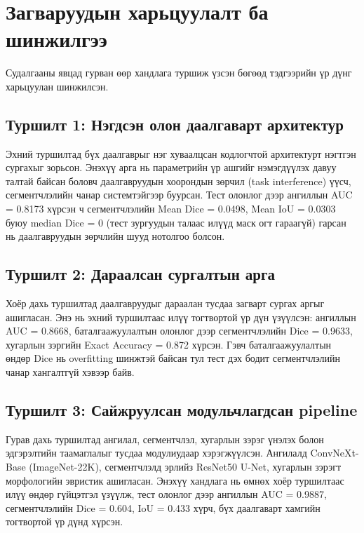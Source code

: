 \section{Загваруудын харьцуулалт ба шинжилгээ}

Судалгааны явцад гурван өөр хандлага туршиж үзсэн бөгөөд тэдгээрийн үр дүнг харьцуулан шинжилсэн.

\subsection{Туршилт 1: Нэгдсэн олон даалгаварт архитектур}

Эхний туршилтад бүх даалгаврыг нэг хуваалцсан кодлогчтой архитектурт нэгтгэн сургахыг зорьсон. Энэхүү арга нь параметрийн үр ашгийг нэмэгдүүлэх давуу талтай байсан боловч даалгавруудын хоорондын зөрчил (task interference) үүсч, сегментчлэлийн чанар системтэйгээр буурсан. Тест олонлог дээр ангиллын AUC = 0.8173 хүрсэн ч сегментчлэлийн Mean Dice = 0.0498, Mean IoU = 0.0303 буюу median Dice = 0 (тест зургуудын талаас илүүд маск огт гараагүй) гарсан нь даалгавруудын зөрчлийн шууд нотолгоо болсон.

\subsection{Туршилт 2: Дараалсан сургалтын арга}

Хоёр дахь туршилтад даалгавруудыг дараалан тусдаа загварт сургах аргыг ашигласан. Энэ нь эхний туршилтаас илүү тогтвортой үр дүн үзүүлсэн: ангиллын AUC = 0.8668, баталгаажуулалтын олонлог дээр сегментчлэлийн Dice = 0.9633, хугарлын зэргийн Exact Accuracy = 0.872 хүрсэн. Гэвч баталгаажуулалтын өндөр Dice нь overfitting шинжтэй байсан тул тест дэх бодит сегментчлэлийн чанар хангалтгүй хэвээр байв.

\subsection{Туршилт 3: Сайжруулсан модульчлагдсан pipeline}

Гурав дахь туршилтад ангилал, сегментчлэл, хугарлын зэрэг үнэлэх болон эдгэрэлтийн таамаглалыг тусдаа модулиудаар хэрэгжүүлсэн. Ангилалд ConvNeXt-Base (ImageNet-22K), сегментчлэлд эрлийз ResNet50 U-Net, хугарлын зэрэгт морфологийн эвристик ашигласан. Энэхүү хандлага нь өмнөх хоёр туршилтаас илүү өндөр гүйцэтгэл үзүүлж, тест олонлог дээр ангиллын AUC = 0.9887, сегментчлэлийн Dice = 0.604, IoU = 0.433 хүрч, бүх даалгаварт хамгийн тогтвортой үр дүнд хүрсэн.

